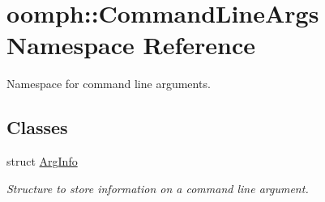 \hypertarget{namespaceoomph_1_1CommandLineArgs}{}\section{oomph\+:\+:Command\+Line\+Args Namespace Reference}
\label{namespaceoomph_1_1CommandLineArgs}


Namespace for command line arguments.  


\subsection*{Classes}
\begin{DoxyCompactItemize}
\item 
struct \hyperlink{structoomph_1_1CommandLineArgs_1_1ArgInfo}{Arg\+Info}
\begin{DoxyCompactList}\small\item\em Structure to store information on a command line argument. \end{DoxyCompactList}\end{DoxyCompactItemize}
